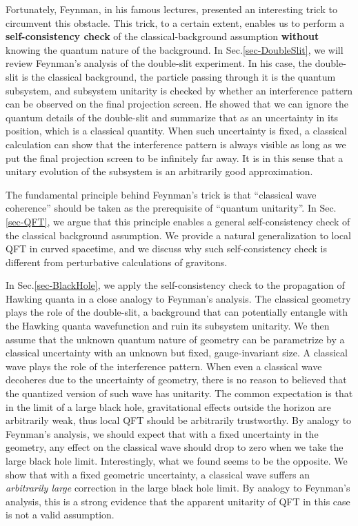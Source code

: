 \documentclass[aps,showpacs,onecolumn,floats,prd,superscriptaddress,nofootinbib]{revtex4-1}
\begin{document}
Fortunately, Feynman, in his famous lectures, presented an interesting trick to circumvent this obstacle. 
This trick, to a certain extent, enables us to perform a {\bf self-consistency check} of the classical-background assumption {\bf without} knowing the quantum nature of the background.
In Sec.\ref{sec-DoubleSlit}, we will review Feynman's analysis of the double-slit experiment. 
In his case, the double-slit is the classical background, the particle passing through it is the quantum subsystem, and subsystem unitarity is checked by whether an interference pattern can be observed on the final projection screen. 
He showed that we can ignore the quantum details of the double-slit and summarize that as an uncertainty in its position, which is a classical quantity. 
When such uncertainty is fixed, a classical calculation can show that the interference pattern is always visible as long as we put the final projection screen to be infinitely far away. 
It is in this sense that a unitary evolution of the subsystem is an arbitrarily good approximation.

The fundamental principle behind Feynman's trick is that ``classical wave coherence'' should be taken as the prerequisite of ``quantum unitarity''. 
In Sec.\ref{sec-QFT}, we argue that this principle enables a general self-consistency check of the classical background assumption. 
We provide a natural generalization to local QFT in curved spacetime, and we discuss why such self-consistency check is different from perturbative calculations of gravitons.

In Sec.\ref{sec-BlackHole}, we apply the self-consistency check to the propagation of Hawking quanta in a close analogy to Feynman's analysis. 
The classical geometry plays the role of the double-slit, a background that can potentially entangle with the Hawking quanta wavefunction and ruin its subsystem unitarity. 
We then assume that the unknown quantum nature of geometry can be parametrize by a classical uncertainty with an unknown but fixed, gauge-invariant size. 
A classical wave plays the role of the interference pattern. 
When even a classical wave decoheres due to the uncertainty of geometry, there is no reason to believed that the quantized version of such wave has unitarity.
The common expectation is that in the limit of a large black hole, gravitational effects outside the horizon are arbitrarily weak, thus local QFT should be arbitrarily trustworthy.
By analogy to Feynman's analysis, we should expect that with a fixed uncertainty in the geometry, any effect on the classical wave should drop to zero when we take the large black hole limit.
Interestingly, what we found seems to be the opposite. 
We show that with a fixed geometric uncertainty, a classical wave suffers an {\it arbitrarily large} correction in the large black hole limit.
By analogy to Feynman's analysis, this is a strong evidence that the apparent unitarity of QFT in this case is not a valid assumption.
\end{document}
